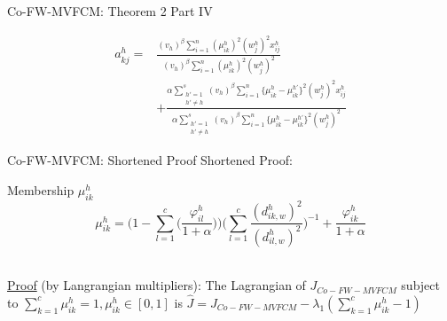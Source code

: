 \documentclass[compress,sky blue]{beamer}
\begin{document}
\begin{frame}{Co-FW-MVFCM: Theorem 2 Part IV}

\begin{equation}
\begin{aligned}
a_{kj}^{h}  ={} &  \frac { (v_{h})^{\beta}\sum_{i=1}^{n}(\mu_{ik}^{h})^{2} (w_{j}^{h})^{2} x_{ij}^{h}}  { (v_{h})^{\beta}\sum_{i=1}^{n}(\mu_{ik}^{h})^{2} (w_{j}^{h})^{2} } \\
      & +  \frac {\alpha \sum_{\substack{h'= 1\\ h'\ne h}}^{s} (v_{h})^{\beta} \sum_{i=1}^{n} \{ \mu_{ik}^{h}-\mu_{ik}^{h'} \}^{2} (w_{j}^{h})^{2} x_{ij}^{h}  } { \alpha \sum_{\substack{h'= 1\\ h'\ne h}}^{s} (v_{h})^{\beta} \sum_{i=1}^{n} \{ \mu_{ik}^{h}-\mu_{ik}^{h'} \}^{2} (w_{j}^{h})^{2} }
\end{aligned}
\label{Theorem2A} 
\end{equation}



\end{frame}


\begin{frame}{Co-FW-MVFCM: Shortened Proof}
\vspace{-0.6cm}
Shortened Proof:
\begin{block}{Membership $\mu_{ik}^{h}$}
\begin{equation*}
\mu_{ik}^{h}=\bigg(1-\sum_{l=1}^{c}\Big(\frac{\varphi_{il}^{h}} {1+\alpha} \Big) \bigg)  \Bigg(\sum_{l=1}^{c} \frac {(d_{ik,w}^{h})^{2}} {(d_{il,w}^{h} )^{2}} \Bigg)^{-1} + \frac{\varphi_{ik}^{h}}{1+\alpha} 
   \label{UpdatingU1}  
\end{equation*}\\
\medskip
\end{block}
\underline{Proof} (by Langrangian multipliers): The Lagrangian of $J_{Co-FW-MVFCM}$  subject to $\sum_{k=1}^{c}\mu_{ik}^{h}=1, \mu_{ik}^{h}\in[0,1] $ is $\hat{J}=J_{Co-FW-MVFCM}-\lambda_{1} \left(\sum_{k=1}^{c}\mu_{ik}^{h}-1 \right)$


\end{frame}

\end{document}
